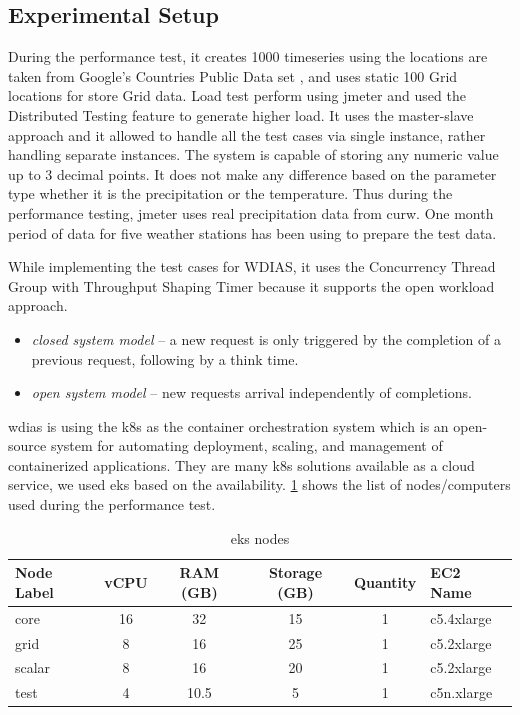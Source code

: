 \documentclass[conference]{IEEEtran}
\begin{document}
\subsection{Experimental Setup}
\label{psubse:experimental_setup}

During the performance test, it creates 1000 timeseries using the locations are taken from Google's Countries Public Data set \cite{GoogleGoogleCounties}, and uses static 100 Grid locations for store Grid data. Load test perform using \acrshort{jmeter} and used the Distributed Testing feature to generate higher load. It uses the master-slave approach and it allowed to handle all the test cases via single instance, rather handling separate instances. The system is capable of storing any numeric value up to 3 decimal points. It does not make any difference based on the parameter type whether it is the precipitation or the temperature. Thus during the performance testing, \acrshort{jmeter} uses real precipitation data from \acrshort{curw}. One month period of data for five weather stations has been using to prepare the test data.

While implementing the test cases for WDIAS, it uses the Concurrency Thread Group
with Throughput Shaping Timer because it supports the open workload approach.

\begin{itemize}
    \item \emph{closed system model} \cite{Haggett1998AnWales} -- a new request is only triggered by the completion of a previous request, following by a think time.
    \item \emph{open system model} -- new requests arrival independently of completions.
\end{itemize}

\acrshort{wdias} is using the \acrfull{k8s} as the container orchestration system which is an open-source system for automating deployment, scaling, and management of containerized applications. They are many \acrshort{k8s} solutions available as a cloud service, we used \acrfull{eks} based on the availability. \cref{ptab:aws_eks_nodes} shows the list of nodes/computers used during the performance test.

\begin{table}[ht]
\centering
\caption{\acrshort{eks} nodes}
\footnotesize
\begin{tabular}{|l|c|c|c|c|l|}
\hline
\textbf{Node Label} & \textbf{vCPU} & \textbf{RAM (GB)} & \textbf{Storage (GB)} & \textbf{Quantity} & \textbf{EC2 Name} \\ \hline
core & 16 & 32 & 15 & 1 & c5.4xlarge \\ \hline
grid & 8 & 16 & 25 & 1 & c5.2xlarge \\ \hline
scalar & 8 & 16 & 20 & 1 & c5.2xlarge \\ \hline
test & 4 & 10.5 & 5 & 1 & c5n.xlarge \\ \hline
\end{tabular}
\label{ptab:aws_eks_nodes}
\end{table}
\end{document}

